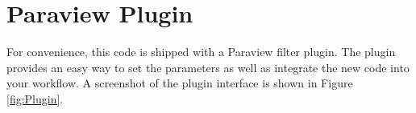 \documentclass{InsightArticle}
\begin{document}
\pagebreak
\section{Paraview Plugin}
For convenience, this code is shipped with a Paraview filter plugin. The plugin provides an easy way to set the parameters as well as integrate the new code into your workflow. A screenshot of the plugin interface is shown in Figure \ref{fig:Plugin}.




\end{document}

